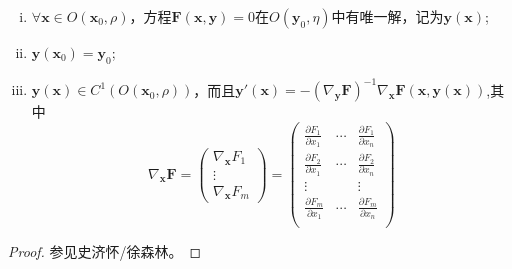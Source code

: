 \documentclass[UTF8]{ctexart}
\begin{document}
        \begin{enumerate}[(i)]
            \item $\forall\boldsymbol{x}\in O(\boldsymbol{x}_0,\rho)$，方程$\boldsymbol{F}(\boldsymbol{x},\boldsymbol{y})=0$在$O(\boldsymbol{y}_0,\eta)$中有唯一解，记为$\boldsymbol{y}(\boldsymbol{x})$;
            \item $\boldsymbol{y}(\boldsymbol{x}_0)=\boldsymbol{y}_0$;
            \item $\boldsymbol{y}(\boldsymbol{x})\in C^1(O(\boldsymbol{x}_0,\rho))$，而且$\boldsymbol{y}'(\boldsymbol{x})=-\left(\nabla_{\boldsymbol{y}}\boldsymbol{F}\right)^{-1}\nabla_{\boldsymbol{x}}\boldsymbol{F}(\boldsymbol{x},\boldsymbol{y}(\boldsymbol{x}))$,其中$$\nabla_{\boldsymbol{x}}\boldsymbol{F}=\begin{pmatrix}
                \nabla_{\boldsymbol{x}}F_1\\
                \vdots\\
                \nabla_{\boldsymbol{x}}F_m
            \end{pmatrix}=\begin{pmatrix}
                \frac{\partial F_1}{\partial x_1}&\cdots&\frac{\partial F_1}{\partial x_n}\\
                \frac{\partial F_2}{\partial x_1}&\cdots&\frac{\partial F_2}{\partial x_n}\\
                \vdots&&\vdots\\
                \frac{\partial F_m}{\partial x_1}&\cdots&\frac{\partial F_m}{\partial x_n}\\
            \end{pmatrix}$$
        \end{enumerate}
        \begin{proof}
            参见史济怀/徐森林。
        \end{proof}
\end{document}
